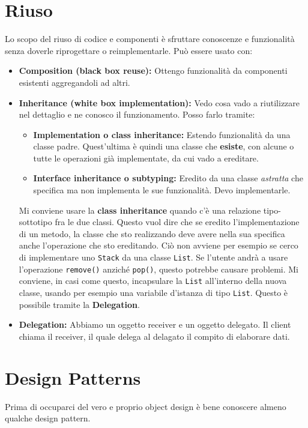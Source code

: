     \section{Riuso}
        Lo scopo del riuso di codice e componenti è sfruttare conoscenze e funzionalità senza doverle riprogettare o reimplementarle. Può essere usato con:
        \begin{itemize}
            \item \textbf{Composition (black box reuse):} Ottengo funzionalità da componenti esistenti aggregandoli ad altri.
            \item \textbf{Inheritance (white box implementation):} Vedo cosa vado a riutilizzare nel dettaglio e ne conosco il funzionamento. Posso farlo tramite:
            \begin{itemize}
                \item \textbf{Implementation o class inheritance:} Estendo funzionalità da una classe padre. Quest'ultima è quindi una classe che \textbf{esiste}, con alcune o tutte le operazioni già implementate, da cui vado a ereditare.
                \item \textbf{Interface inheritance o subtyping:} Eredito da una classe \textit{astratta} che specifica ma non implementa le sue funzionalità. Devo implementarle.
            \end{itemize}
            
            Mi conviene usare la \textbf{class inheritance} quando c'è una relazione tipo-sottotipo fra le due classi. Questo vuol dire che se eredito l'implementazione di un metodo, la classe che sto realizzando deve avere nella sua specifica anche l'operazione che sto ereditando. Ciò non avviene per esempio se cerco di implementare uno \texttt{Stack} da una classe \texttt{List}. Se l'utente andrà a usare l'operazione \texttt{remove()} anziché \texttt{pop()}, questo potrebbe causare problemi. Mi conviene, in casi come questo, incapsulare la \texttt{List} all'interno della nuova classe, usando per esempio una variabile d'istanza di tipo \texttt{List}. Questo è possibile tramite la \textbf{Delegation}.
            
            \item \textbf{Delegation:} Abbiamo un oggetto receiver e un oggetto delegato. Il client chiama il receiver, il quale delega al delagato il compito di elaborare dati.
        \end{itemize}
    
    \section{Design Patterns}
        Prima di occuparci del vero e proprio object design è bene conoscere almeno qualche design pattern.
        
